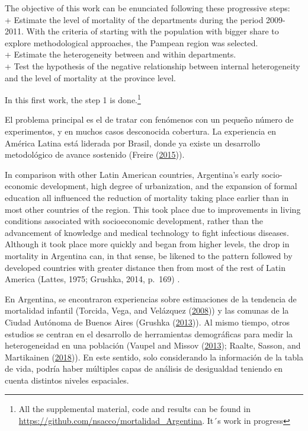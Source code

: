 \documentclass[12pt,]{article}
\begin{document}
The objective of this work can be enunciated following these progressive
steps:\\
+ Estimate the level of mortality of the departments during the period
2009-2011. With the criteria of starting with the population with bigger
share to explore methodological approaches, the Pampean region was
selected.\\
+ Estimate the heterogeneity between and within departments.\\
+ Test the hypothesis of the negative relationship between internal
heterogeneity and the level of mortality at the province level.

In this first work, the step 1 is done.\footnote{All the supplemental
  material, code and results can be found in
  \url{https://github.com/nsacco/mortalidad_Argentina}. It´s work in
  progress}

El problema principal es el de tratar con fenómenos con un pequeño
número de experimentos, y en muchos casos desconocida cobertura. La
experiencia en América Latina está liderada por Brasil, donde ya existe
un desarrollo metodológico de avance sostenido (Freire
(\protect\hyperlink{ref-FreireEtAl2015}{2015})).

In comparison with other Latin American countries, Argentina's early
socio-economic development, high degree of urbanization, and the
expansion of formal education all influenced the reduction of mortality
taking place earlier than in most other countries of the region. This
took place due to improvements in living conditions associated with
socioeconomic development, rather than the advancement of knowledge and
medical technology to fight infectious diseases. Although it took place
more quickly and began from higher levels, the drop in mortality in
Argentina can, in that sense, be likened to the pattern followed by
developed countries with greater distance then from most of the rest of
Latin America (Lattes, 1975; Grushka, 2014, p.~169) .

En Argentina, se encontraron experiencias sobre estimaciones de la
tendencia de mortalidad infantil (Torcida, Vega, and Velázquez
(\protect\hyperlink{ref-torcida2008}{2008})) y las comunas de la Ciudad
Autónoma de Buenos Aires (Grushka
(\protect\hyperlink{ref-Grushka2013}{2013})). Al mismo tiempo, otros
estudios se centran en el desarrollo de herramientas demográficas para
medir la heterogeneidad en una población (Vaupel and Missov
(\protect\hyperlink{ref-Vaupel_Missov_2013}{2013}); Raalte, Sasson, and
Martikainen
(\protect\hyperlink{ref-vanRaalte_Sasson_Martikainen_2018}{2018})). En
este sentido, solo considerando la información de la tabla de vida,
podría haber múltiples capas de análisis de desigualdad teniendo en
cuenta distintos niveles espaciales.
\end{document}
